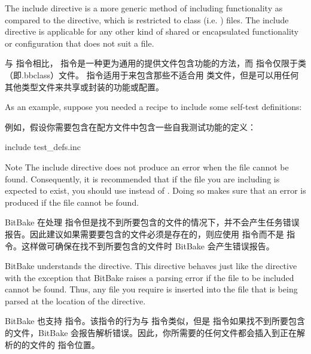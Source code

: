 The include directive is a more generic method of including functionality as compared to the  directive, which is restricted to class (i.e. ) files. The include directive is applicable for any other kind of shared or encapsulated functionality or configuration that does not suit a  file.

与  指令相比， 指令是一种更为通用的提供文件包含功能的方法，而  指令仅限于类（即.bbclass）文件。  指令适用于来包含那些不适合用  类文件，但是可以用任何其他类型文件来共享或封装的功能或配置。

As an example, suppose you needed a recipe to include some self-test definitions:

例如，假设你需要包含在配方文件中包含一些自我测试功能的定义：

\begin{pyglist}
include test_defs.inc
\end{pyglist}

\begin{noteblock}{Note}%
The include directive does not produce an error when the file cannot be found. Consequently, it is recommended that if the file you are including is expected to exist, you should use  instead of  . Doing so makes sure that an error is produced if the file cannot be found.

\medskip
BitBake 在处理  指令但是找不到所要包含的文件的情况下，并不会产生任务错误报告。因此建议如果需要要包含的文件必须是存在的，则应使用 指令而不是  指令。这样做可确保在找不到所要包含的文件时 BitBake 会产生错误报告。
\end{noteblock}

\label{section:require}

BitBake understands the  directive. This directive behaves just like the  directive with the exception that BitBake raises a parsing error if the file to be included cannot be found. Thus, any file you require is inserted into the file that is being parsed at the location of the directive.

BitBake 也支持  指令。该指令的行为与  指令类似，但是  指令如果找不到所要包含的文件，BitBake 会报告解析错误。因此，你所需要的任何文件都会插入到正在解析的的文件的  指令位置。

